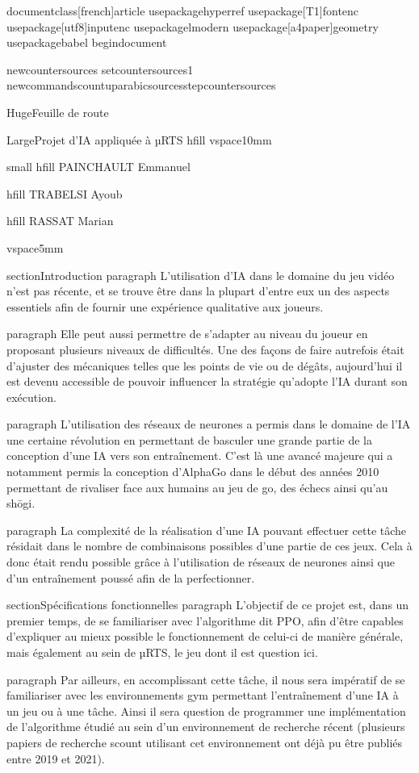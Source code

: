 documentclass[french]{article}
usepackage{hyperref}
usepackage[T1]{fontenc}
usepackage[utf8]{inputenc}
usepackage{lmodern}
usepackage[a4paper]{geometry}
usepackage{babel}
begin{document}
	
	newcounter{sources}
	setcounter{sources}{1}
	newcommand{scount}{up{arabic{sources}}stepcounter{sources}}
	
	Huge{Feuille de route}
	
	Large{Projet d'IA appliquée à µRTS} hfill
	vspace{10mm}
	
	small
	hfill PAINCHAULT Emmanuel
	
	hfill TRABELSI Ayoub
	
	hfill RASSAT Marian
	
	vspace{5mm}
	
	section{Introduction}
	paragraph{}
	L’utilisation d’IA dans le domaine du jeu vidéo n’est pas récente, et se trouve être dans la plupart d’entre eux un des aspects essentiels afin de fournir une expérience qualitative aux joueurs.
	
	paragraph{}
	Elle peut aussi permettre de s’adapter au niveau du joueur en proposant plusieurs niveaux de difficultés. Une des façons de faire autrefois était d’ajuster des mécaniques telles que les points de vie ou de dégâts, aujourd’hui il est devenu accessible de pouvoir influencer la stratégie qu'adopte l’IA durant son exécution.
	
	paragraph{}
	L'utilisation des réseaux de neurones a permis dans le domaine de l'IA  une certaine révolution en permettant de basculer une grande partie de la conception d'une IA vers son entraînement. C'est là une avancé majeure qui a notamment permis la conception d'AlphaGo dans le début des années 2010 permettant de rivaliser face aux humains au jeu de go, des échecs ainsi qu'au shōgi.
	
	paragraph{}
	La complexité de la réalisation d'une IA pouvant effectuer cette tâche résidait dans le nombre de combinaisons possibles d'une partie de ces jeux. Cela à donc était rendu possible grâce à l'utilisation de réseaux de neurones ainsi que d'un entraînement poussé afin de la perfectionner.
	
	section{Spécifications fonctionnelles}
	paragraph{}
	L'objectif de ce projet est, dans un premier temps, de se familiariser avec l'algorithme dit PPO, afin d'être capables d'expliquer au mieux possible le fonctionnement de celui-ci de manière générale, mais également au sein de µRTS, le jeu dont il est question ici.
	
	paragraph{}
	Par ailleurs, en accomplissant cette tâche, il nous sera impératif de se familiariser avec les environnements gym permettant l'entraînement d'une IA à un jeu ou à une tâche. Ainsi il sera question de programmer une implémentation de l'algorithme étudié au sein d'un environnement de recherche récent (plusieurs papiers de recherche scount utilisant cet environnement ont déjà pu être publiés entre 2019 et 2021).
	
